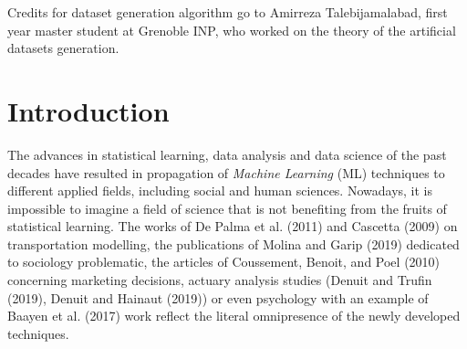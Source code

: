 \documentclass[12pt,]{article}
\begin{document}
\vspace{10mm}

Credits for dataset generation algorithm go to Amirreza Talebijamalabad,
first year master student at Grenoble INP, who worked on the theory of
the artificial datasets generation.

\newpage


\setcounter{tocdepth}{1}


\newpage


\hypertarget{introduction}{%
\section*{Introduction}\label{introduction}}

The advances in statistical learning, data analysis and data science of
the past decades have resulted in propagation of \emph{Machine Learning}
(ML) techniques to different applied fields, including social and human
sciences. Nowadays, it is impossible to imagine a field of science that
is not benefiting from the fruits of statistical learning. The works of
De Palma et al. (2011) and Cascetta (2009) on transportation modelling,
the publications of Molina and Garip (2019) dedicated to sociology
problematic, the articles of Coussement, Benoit, and Poel (2010)
concerning marketing decisions, actuary analysis studies (Denuit and
Trufin (2019), Denuit and Hainaut (2019)) or even psychology with an
example of Baayen et al. (2017) work reflect the literal omnipresence of
the newly developed techniques.
\end{document}
